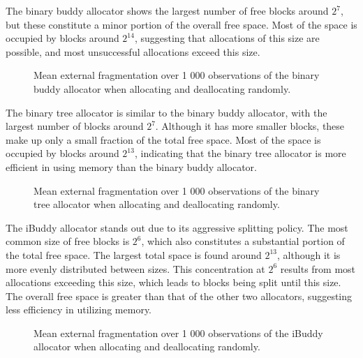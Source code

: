 The binary buddy allocator shows the largest number of free blocks around $2^7$, but these constitute a minor portion of the overall free space. Most of the space is occupied by blocks around $2^{14}$, suggesting that allocations of this size are possible, and most unsuccessful allocations exceed this size.

\begin{figure}[h]
    \centering
    
    \caption{Mean external fragmentation over 1 000 observations of the binary buddy allocator when allocating and deallocating randomly.}
    \label{fig:fragextbinary}
\end{figure}

The binary tree allocator is similar to the binary buddy allocator, with the largest number of blocks around $2^7$. Although it has more smaller blocks, these make up only a small fraction of the total free space. Most of the space is occupied by blocks around $2^{13}$, indicating that the binary tree allocator is more efficient in using memory than the binary buddy allocator.

\begin{figure}[h]
    \centering
    
    \caption{Mean external fragmentation over 1 000 observations of the binary tree allocator when allocating and deallocating randomly.}
    \label{fig:fragextbt}
\end{figure}

\newpage
The iBuddy allocator stands out due to its aggressive splitting policy. The most common size of free blocks is $2^6$, which also constitutes a substantial portion of the total free space. The largest total space is found around $2^{13}$, although it is more evenly distributed between sizes. This concentration at $2^6$ results from most allocations exceeding this size, which leads to blocks being split until this size. The overall free space is greater than that of the other two allocators, suggesting less efficiency in utilizing memory.

\begin{figure}[h]
    \centering
    
    \caption{Mean external fragmentation over 1 000 observations of the iBuddy allocator when allocating and deallocating randomly.}
    \label{fig:fragextibuddy}
\end{figure}

